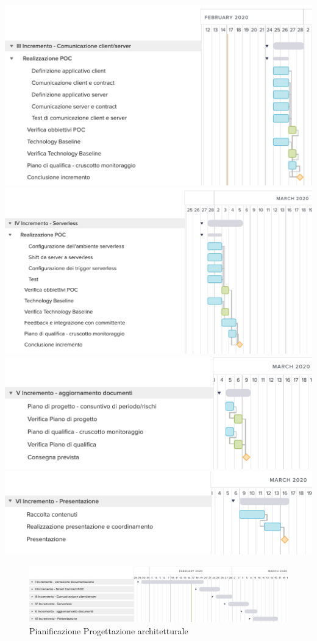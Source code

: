 	\includegraphics[width=\textwidth]{res/img/gantt/RP/3}
	\includegraphics[width=\textwidth]{res/img/gantt/RP/4}
	\includegraphics[width=\textwidth]{res/img/gantt/RP/5}
	\includegraphics[width=\textwidth]{res/img/gantt/RP/6}
\begin{figure}[h!]
	\includegraphics[width=\textwidth]{res/img/gantt/RP/f}
	\caption{Pianificazione Progettazione architetturale}
\end{figure}
\newpage
